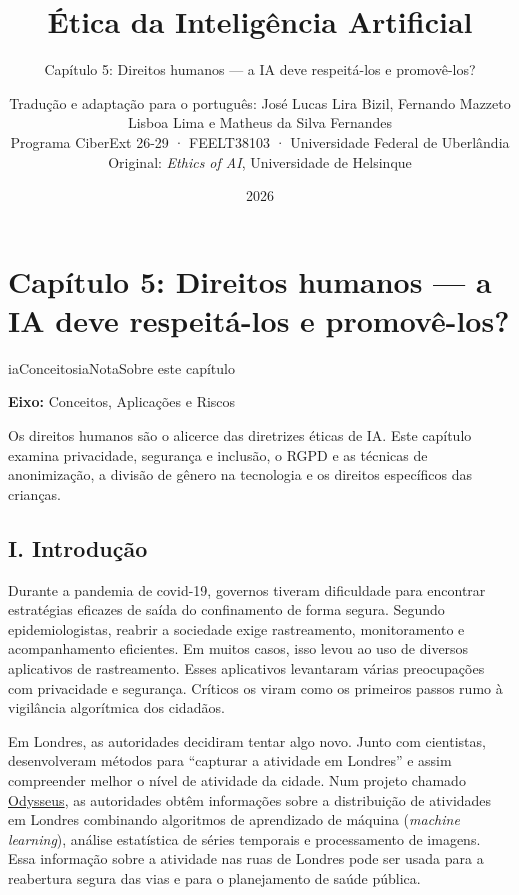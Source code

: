 \documentclass[
  11pt,
]{article}
\title{Ética da Inteligência Artificial}
\subtitle{Capítulo 5: Direitos humanos --- a IA deve respeitá-los e
promovê-los?}
\author{Tradução e adaptação para o português: José Lucas Lira Bizil,
Fernando Mazzeto Lisboa Lima e Matheus da Silva Fernandes\\
Programa CiberExt 26-29 · FEELT38103 · Universidade Federal de
Uberlândia\\
Original: \emph{Ethics of AI}, Universidade de Helsinque}
\date{2026}
\newenvironment{nota}[1][Nota]{\begin{iabox}{iaConceitos}{iaNota}{#1}}{\end{iabox}}
\begin{document}
\maketitle

{
\hypersetup{linkcolor=iaConceitos}
\setcounter{tocdepth}{3}
\tableofcontents
}
\section{Capítulo 5: Direitos humanos --- a IA deve respeitá-los e
promovê-los?}\label{capuxedtulo-5-direitos-humanos-a-ia-deve-respeituxe1-los-e-promovuxea-los}

\begin{nota}[Sobre este capítulo]

\textbf{Eixo:} Conceitos, Aplicações e Riscos

Os direitos humanos são o alicerce das diretrizes éticas de IA. Este
capítulo examina privacidade, segurança e inclusão, o RGPD e as técnicas
de anonimização, a divisão de gênero na tecnologia e os direitos
específicos das crianças.

\end{nota}

\subsection{I. Introdução}\label{i.-introduuxe7uxe3o}

Durante a pandemia de covid-19, governos tiveram dificuldade para
encontrar estratégias eficazes de saída do confinamento de forma segura.
Segundo epidemiologistas, reabrir a sociedade exige rastreamento,
monitoramento e acompanhamento eficientes. Em muitos casos, isso levou
ao uso de diversos aplicativos de rastreamento. Esses aplicativos
levantaram várias preocupações com privacidade e segurança. Críticos os
viram como os primeiros passos rumo à vigilância algorítmica dos
cidadãos.

Em Londres, as autoridades decidiram tentar algo novo. Junto com
cientistas, desenvolveram métodos para ``capturar a atividade em
Londres'' e assim compreender melhor o nível de atividade da cidade. Num
projeto chamado
\href{https://www.turing.ac.uk/research/research-projects/project-odysseus-understanding-london-busyness-and-exiting-lockdown}{Odysseus},
as autoridades obtêm informações sobre a distribuição de atividades em
Londres combinando algoritmos de aprendizado de máquina (\emph{machine
learning}), análise estatística de séries temporais e processamento de
imagens. Essa informação sobre a atividade nas ruas de Londres pode ser
usada para a reabertura segura das vias e para o planejamento de saúde
pública.
\end{document}
